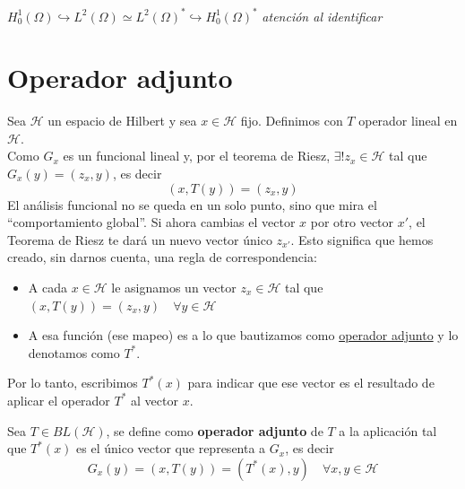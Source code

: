 \begin{ejemplo}
    $H_0^1(\Omega) \hookrightarrow L^2(\Omega) \simeq L^2(\Omega)^* \hookrightarrow H_0^1(\Omega)^*$ \quad \textit{atención al identificar}
\end{ejemplo}

\section{Operador adjunto}

\noindent
Sea $\mathcal{H}$ un espacio de Hilbert y sea $x \in \mathcal{H}$ fijo. Definimos 
con $T$ operador lineal en $\mathcal{H}$. \\
\noindent
Como $G_x$ es un funcional lineal y, por el teorema de Riesz, $\exists! z_x \in \mathcal{H}$ tal que $G_x(y) = (z_x, y)$, es decir
\[ (x, T(y)) = (z_x, y) \]
El análisis funcional no se queda en un solo punto, sino que mira el ``comportamiento global''. Si ahora cambias el vector $x$ por otro vector $x'$, el Teorema de Riesz te dará un nuevo vector único $z_{x'}$. Esto significa que hemos creado, sin darnos cuenta, una regla de correspondencia:

\begin{itemize}
    \item A cada $x \in \mathcal{H}$ le asignamos un vector $z_x \in \mathcal{H}$ tal que $(x, T(y)) = (z_x, y) \quad \forall y \in \mathcal{H}$
    \item A esa función (ese mapeo) es a lo que bautizamos como \underline{operador adjunto} y lo denotamos como $T^*$.  
\end{itemize}
\noindent
Por lo tanto, escribimos $T^*(x)$ para indicar que ese vector es el resultado de aplicar el operador $T^*$ al vector $x$.

\begin{definicion}
    Sea $T \in BL(\mathcal{H})$, se define como \textbf{operador adjunto} de $T$ a la aplicación
    tal que $T^*(x)$ es el único vector que representa a $G_x$, es decir
    \[ G_x(y)=(x, T(y)) = (T^*(x), y) \quad \forall x, y \in \mathcal{H} \]
\end{definicion}

